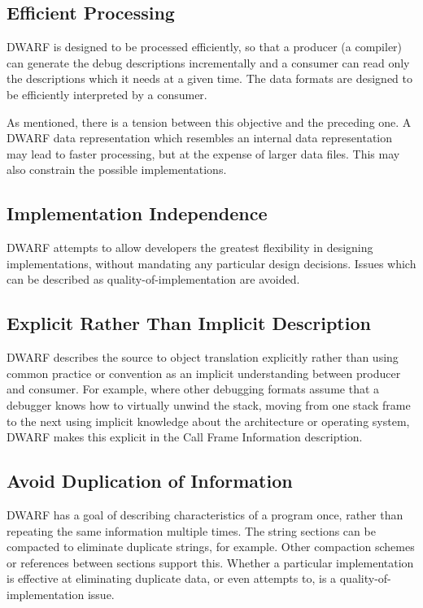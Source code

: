 \subsection{Efficient Processing} 
DWARF is designed to be processed efficiently, so that a 
producer (a compiler) can generate the debug descriptions 
incrementally and a consumer can read only the descriptions 
which it needs at a given time. The data formats are designed 
to be efficiently interpreted by a consumer.

As mentioned, there is a tension between this objective and 
the preceding one.  A DWARF data representation which resembles 
an internal data representation may lead to faster processing, 
but at the expense of larger data files. This may also constrain 
the possible implementations.

\subsection{Implementation Independence}
DWARF attempts to allow developers the greatest flexibility 
in designing implementations, without mandating any particular 
design decisions. Issues which can be described as 
quality-of-implementation are avoided.

\subsection{Explicit Rather Than Implicit Description}
DWARF describes the source to object translation explicitly 
rather than using common practice or convention as an implicit 
understanding between producer and consumer.  For example, where 
other debugging formats assume that a debugger knows how to 
virtually unwind the stack, moving from one stack frame to the next using 
implicit knowledge about the architecture or operating system, 
DWARF makes this explicit in the Call Frame Information description.

\subsection{Avoid Duplication of Information}
DWARF has a goal of describing characteristics of a program once, 
rather than repeating the same information multiple times.  The 
string sections can be compacted to eliminate duplicate strings, 
for example.  Other compaction schemes or references between 
sections support this. Whether a particular implementation is 
effective at eliminating duplicate data, or even attempts to, 
is a quality-of-implementation issue.  

